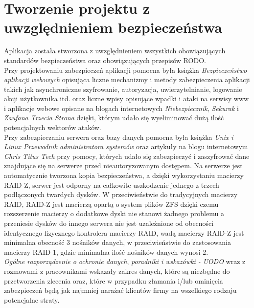 \documentclass[12pt,a4paper]{article}
\begin{document}
	\newpage
	
	\section{Tworzenie projektu z uwzględnieniem bezpieczeństwa}
		\indent Aplikacja została stworzona z uwzględnieniem wszystkich obowiązujących standardów bezpieczeństwa oraz obowiązujących przepisów RODO.\\
		\indent Przy projektowaniu zabezpieczeń aplikacji pomocna była książka \emph{Bezpieczeństwo aplikacji webowych}\cite{BAW} opisująca liczne mechanizmy i metody zabezpieczenia
			aplikacji takich jak asynchroniczne szyfrowanie, autoryzacja, uwierzytelnianie, logowanie akcji użytkownika itd. oraz liczne wpisy opisujące wpadki i ataki na serwisy www
			i aplikacje webowe opisane na blogach internetowych	\emph{Niebezpiecznik}\cite{Nieb}, \emph{Sekurak}\cite{Sek} i \emph{Zaufana Trzecia Strona}\cite{ZTS} dzięki,
			którym udało się wyeliminować dużą ilość potencjalnych wektorów ataków.\\
		\indent Przy zabezpieczaniu serwera oraz bazy danych pomocna była książka \emph{Unix i Linux Przewodnik	administratora systemów}\cite{Unix} oraz artykuły na blogu internetowym
			\emph{Chris Titus Tech}\cite{CTT} przy pomocy, których udało się zabezpieczyć i zaszyfrować dane znajdujące się na serwerze przed nieautoryzowanym dostępem. Na serwerze jest 
			automatycznie tworzona kopia bezpieczeństwa, a dzięki wykorzystaniu	macierzy RAID-Z, serwer jest odporny na całkowite uszkodzenie jednego z trzech podłączonych
			twardych dysków. W przeciwieństwie do tradycyjnych macierzy RAID, RAID-Z jest macierzą opartą o system plików ZFS dzięki czemu rozszerzenie macierzy o dodatkowe dyski nie
			stanowi żadnego problemu a przeniesie dysków do innego serwera nie jest uzależnione od obecności identycznego fizycznego kontrolera macierzy RAID, wadą macierzy RAID-Z jest
			minimalna obecność 3 nośników danych, w przeciwieństwie do zastosowania macierzy RAID 1, gdzie minimalna ilość nośników danych wynosi 2.\\
		\indent \emph{Ogólne rozporządzenie o ochronie danych}\cite{RODO}, \emph{poradniki i wskazówki - UODO}\cite{UODO} wraz z rozmowami z pracownikami wskazały zakres danych, które są
			niezbędne do przetworzenia zlecenia oraz, które w przypadku złamania i/lub ominięcia zabezpieczeń będą jak najmniej narażać klientów firmy na wszelkiego rodzaju potencjalne
			straty.  
	\newpage
	
\end{document}
